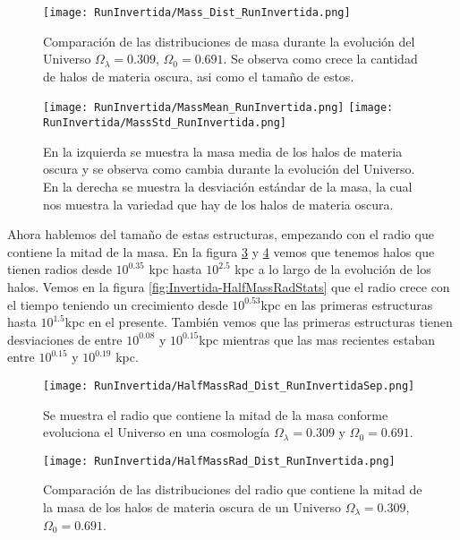 \begin{figure}[H]
    \centering
    \texttt{[image: RunInvertida/Mass\_Dist\_RunInvertida.png]}
    \caption[Comparación de distribución de masa]{\footnotesize Comparación de las distribuciones de masa durante la evolución del Universo $\Omega_\lambda = 0.309 $, $\Omega_0 = 0.691$. Se observa como crece la cantidad de halos de materia oscura, asi como el tamaño de estos.}
    \label{fig:Invertida-MassDist}
\end{figure}

\begin{figure}[H]
    \centering
    \texttt{[image: RunInvertida/MassMean\_RunInvertida.png]}
    \texttt{[image: RunInvertida/MassStd\_RunInvertida.png]}
    \caption[Media y desviación estándar de la distribución de masa]{\footnotesize En la izquierda se muestra la masa media de los halos de materia oscura y se observa como cambia durante la evolución del Universo. En la derecha se muestra la desviación estándar de la masa, la cual nos muestra la variedad que hay de los halos de materia oscura.}
    \label{fig:Invertida-MassStats}
\end{figure}

Ahora hablemos del tamaño de estas estructuras, empezando con el radio que contiene la mitad de la masa. En la figura \ref{fig:Invertida-HalfMassRadDistSep} y \ref{fig:Invertida-HalfMassRadDist} vemos que tenemos halos que tienen radios desde $10^{0.35}$ kpc hasta $10^{2.5}$ kpc a lo largo de la evolución de los halos. Vemos en la figura \ref{fig:Invertida-HalfMassRadStats} que el radio crece con el tiempo teniendo un crecimiento desde $10^{0.53}$kpc en las primeras estructuras hasta $10^{1.5}$kpc en el presente. También vemos que las primeras estructuras tienen desviaciones de entre $10^{0.08}$ y $10^{0.15}$kpc mientras que las mas recientes estaban entre $10^{0.15}$ y $10^{0.19}$ kpc.

\begin{figure}[H]
    \centering
    \texttt{[image: RunInvertida/HalfMassRad\_Dist\_RunInvertidaSep.png]}
    \caption[Radio que contiene la mitad de la masa]{\footnotesize Se muestra el radio que contiene la mitad de la masa conforme evoluciona el Universo en una cosmología $\Omega_\lambda = 0.309 $ y $\Omega_0 = 0.691$.}
    \label{fig:Invertida-HalfMassRadDistSep}
\end{figure}

\begin{figure}[H]
    \centering
    \texttt{[image: RunInvertida/HalfMassRad\_Dist\_RunInvertida.png]}
    \caption[Distribución del Radio que contiene la mitad de la masa]{\footnotesize Comparación de las distribuciones del radio que contiene la mitad de la masa de los halos de materia oscura de un Universo $\Omega_\lambda = 0.309 $, $\Omega_0 = 0.691$.}
    \label{fig:Invertida-HalfMassRadDist}
\end{figure}

